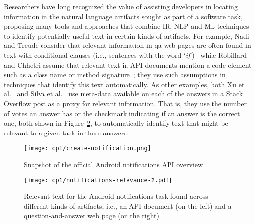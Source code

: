  Researchers have long recognized the value of 
  assisting developers in locating information in the natural language artifacts sought as part of a software task,
 proposing many tools and approaches 
 that combine \acf{IR}, \acf{NLP} and \acf{ML} techniques to identify potentially useful text in certain kinds of artifacts. 
 For example, Nadi and Treude consider 
 that relevant information in \acs{qa} 
 web pages are often found in text with
 conditional clauses (i.e., sentences with the word `\textit{if}')~\cite{nadi2020}
 while Robillard and Chhetri assume that relevant 
 text in API documents mention a code element such as a class name or method signature~\cite{Robillard2015}; they use such assumptions 
 in techniques that identify this text automatically.
 As other examples, both Xu et al.~\cite{Xu2017} 
 and Silva et al.~\cite{silva2019} use 
 meta-data available on each of the answers in a Stack Overflow post 
 as a proxy for relevant information.
 That is, they use the number of votes an answer has or the checkmark indicating if an answer is the correct one, both shown in Figure~\ref{fig:anatomy-of-relevant-text}, 
 to automatically identify text that might be relevant to a given task in these answers. 
 
 

\begin{landscape}
\begin{figure}
    \centering
    \texttt{[image: cp1/create-notification.png]}
    \caption{Snapshot of the official Android notifications API overview}
    \label{fig:android-create-notification}
\end{figure}
\end{landscape}
    

 
 
 

\begin{landscape}
\begin{figure}
    \centering
    \texttt{[image: cp1/notifications-relevance-2.pdf]}
    \caption{Relevant text for the Android notifications task found across different kinds of artifacts, i.e., an API document (on the left) and a question-and-answer web page (on the right)}
    \label{fig:anatomy-of-relevant-text}
\end{figure}
\end{landscape}

